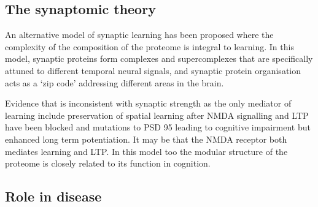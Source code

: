  
\subsection{The synaptomic theory}

An alternative model of synaptic learning has been proposed where the complexity of the composition of the proteome is integral to learning\cite{grant2019synapse}. In this model, synaptic proteins form complexes and supercomplexes that are specifically attuned to different temporal neural signals, and synaptic protein organisation acts as a `zip code' addressing different areas in the brain\cite{grant2018synaptomic}.

Evidence that is inconsistent with synaptic strength as the only mediator of learning\cite{grant2019synapse} include preservation of spatial learning after NMDA signalling and LTP have been blocked\cite{bannerman2014hippocampal} and mutations to PSD 95 leading to cognitive impairment but enhanced long term potentiation\cite{nithianantharajah2013synaptic}. It may be that the NMDA receptor both mediates learning and LTP\cite{grant2019synapse}. In this model too the modular structure of the proteome is closely related to its function in cognition. 



\subsection{Role in disease}
 
